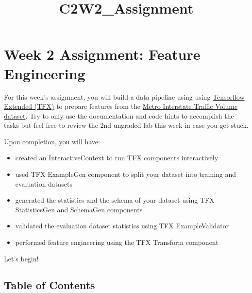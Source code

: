 \documentclass[11pt]{article}
\title{C2W2\_Assignment}
\providecommand{\tightlist}{%
      \setlength{\itemsep}{0pt}\setlength{\parskip}{0pt}}
\begin{document}
    
    \maketitle
    
    

    
    \hypertarget{week-2-assignment-feature-engineering}{%
\section{Week 2 Assignment: Feature
Engineering}\label{week-2-assignment-feature-engineering}}

    For this week's assignment, you will build a data pipeline using using
\href{https://www.tensorflow.org/tfx}{Tensorflow Extended (TFX)} to
prepare features from the
\href{https://archive.ics.uci.edu/ml/datasets/Metro+Interstate+Traffic+Volume}{Metro
Interstate Traffic Volume dataset}. Try to only use the documentation
and code hints to accomplish the tasks but feel free to review the 2nd
ungraded lab this week in case you get stuck.

Upon completion, you will have:

\begin{itemize}
\tightlist
\item
  created an InteractiveContext to run TFX components interactively
\item
  used TFX ExampleGen component to split your dataset into training and
  evaluation datasets
\item
  generated the statistics and the schema of your dataset using TFX
  StatisticsGen and SchemaGen components
\item
  validated the evaluation dataset statistics using TFX ExampleValidator
\item
  performed feature engineering using the TFX Transform component
\end{itemize}

Let's begin!

    \hypertarget{table-of-contents}{%
\subsection{Table of Contents}\label{table-of-contents}}
\end{document}
